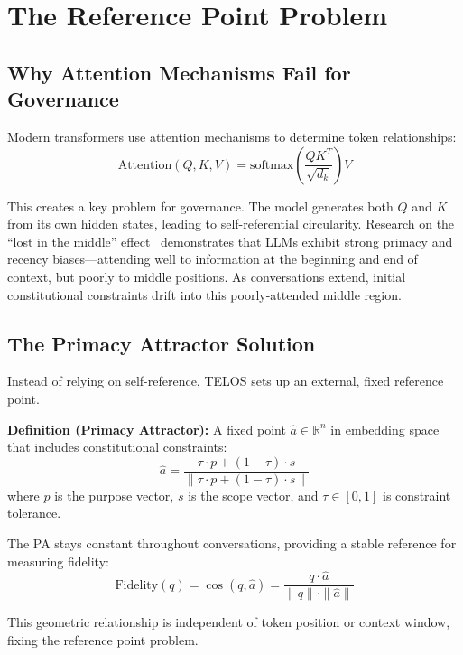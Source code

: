 \documentclass[11pt,twocolumn]{article}
\begin{document}
\section{The Reference Point Problem}

\subsection{Why Attention Mechanisms Fail for Governance}

Modern transformers use attention mechanisms to determine token relationships:
\begin{equation}
    \text{Attention}(Q,K,V) = \text{softmax}\left(\frac{QK^T}{\sqrt{d_k}}\right)V
\end{equation}

This creates a key problem for governance. The model generates both $Q$ and $K$ from its own hidden states, leading to self-referential circularity. Research on the ``lost in the middle'' effect~\citep{liu2024lost} demonstrates that LLMs exhibit strong primacy and recency biases---attending well to information at the beginning and end of context, but poorly to middle positions. As conversations extend, initial constitutional constraints drift into this poorly-attended middle region.

\subsection{The Primacy Attractor Solution}

Instead of relying on self-reference, TELOS sets up an external, fixed reference point.

\textbf{Definition (Primacy Attractor):} A fixed point $\hat{a} \in \mathbb{R}^n$ in embedding space that includes constitutional constraints:
\begin{equation}
    \hat{a} = \frac{\tau \cdot p + (1-\tau) \cdot s}{\|\tau \cdot p + (1-\tau) \cdot s\|}
\end{equation}
where $p$ is the purpose vector, $s$ is the scope vector, and $\tau \in [0,1]$ is constraint tolerance.

The PA stays constant throughout conversations, providing a stable reference for measuring fidelity:
\begin{equation}
    \text{Fidelity}(q) = \cos(q, \hat{a}) = \frac{q \cdot \hat{a}}{\|q\| \cdot \|\hat{a}\|}
\end{equation}

This geometric relationship is independent of token position or context window, fixing the reference point problem.
\end{document}
